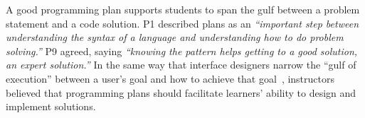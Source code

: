 
A good programming plan supports students to span the gulf between a problem statement and a code solution. P1 described plans as an \textit{``important step between understanding the syntax of a language and understanding how to do problem solving.''} P9 agreed, saying \textit{``knowing the pattern helps getting to a good solution, an expert solution.''} In the same way that interface designers narrow the ``gulf of execution'' between a user's goal and how to achieve that goal~\cite{Norman_UserCenteredSystemDesign_1986}, instructors believed that programming plans should facilitate learners' ability to design and implement solutions.






